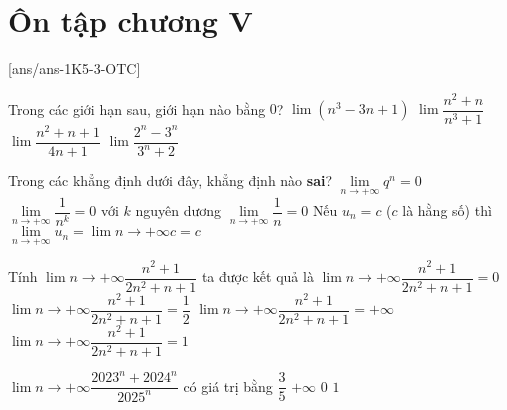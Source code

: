\section{Ôn tập chương V}
\centerline{}
[ans/ans-1K5-3-OTC]
\begin{ex}%
	Trong các giới hạn sau, giới hạn nào bằng $ 0 $?
	\choice
	{$ \lim(n^3-3n+1) $}
	{\True $ \lim\dfrac{n^2+n}{n^3+1} $}
	{$ \lim\dfrac{n^2+n+1}{4n+1} $}
	{$ \lim\dfrac{2^n-3^n}{3^n+2} $}
\end{ex}
\begin{ex}%
	Trong các khẳng định dưới đây, khẳng định nào \textbf{sai}?
	\choice
	{\True $\lim\limits_{n \to +\infty} q^n=0$}
	{$\lim\limits_{n \to +\infty} \dfrac{1}{n^k}=0$ với $k$ nguyên dương}
	{$\lim\limits_{n \to +\infty} \dfrac{1}{n}=0$}
	{Nếu $u_n=c$ ($c$ là hằng số) thì $\lim\limits_{n \to +\infty} u_n=\lim \limits{n \to +\infty}c=c$}
\end{ex}

\begin{ex}%
	Tính $\lim \limits{n \to +\infty}\dfrac{n^2+1}{2n^2+n+1}$ ta được kết quả là
	\choice
	{$\lim \limits{n \to +\infty}\dfrac{n^2+1}{2n^2+n+1}=0$}
	{\True $\lim \limits{n \to +\infty}\dfrac{n^2+1}{2n^2+n+1}=\dfrac{1}{2}$}
	{$\lim \limits{n \to +\infty}\dfrac{n^2+1}{2n^2+n+1}=+\infty $}
	{$\lim \limits{n \to +\infty}\dfrac{n^2+1}{2n^2+n+1}=1$}
\end{ex}

\begin{ex}%
	$\lim \limits{n \to +\infty}\dfrac{2023^n+2024^n}{2025^n}$ có giá trị bằng
	\choice
	{$\dfrac{3}{5}$}
	{$+\infty$}
	{\True $0$}
	{$1$}
\end{ex}

